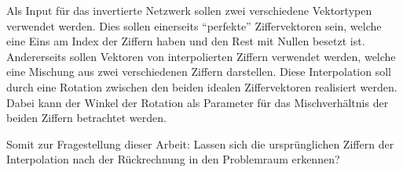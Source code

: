 \documentclass[Interploate_hadwritten_Digits.tex]{subfiles}
\begin{document}
	Als Input für das invertierte Netzwerk sollen zwei verschiedene Vektortypen verwendet werden. Dies sollen einerseits ``perfekte'' Ziffervektoren sein, welche eine Eins am Index der Ziffern haben und den Rest mit Nullen besetzt ist. Andererseits sollen Vektoren von interpolierten Ziffern verwendet werden, welche eine Mischung aus zwei verschiedenen Ziffern darstellen. Diese Interpolation soll durch eine Rotation zwischen den beiden idealen Ziffervektoren realisiert werden. Dabei kann der Winkel der Rotation als Parameter für das Mischverhältnis der beiden Ziffern betrachtet werden.
	
	Somit zur Fragestellung dieser Arbeit: Lassen sich die ursprünglichen Ziffern der Interpolation nach der Rückrechnung in den Problemraum erkennen?
\end{document}

